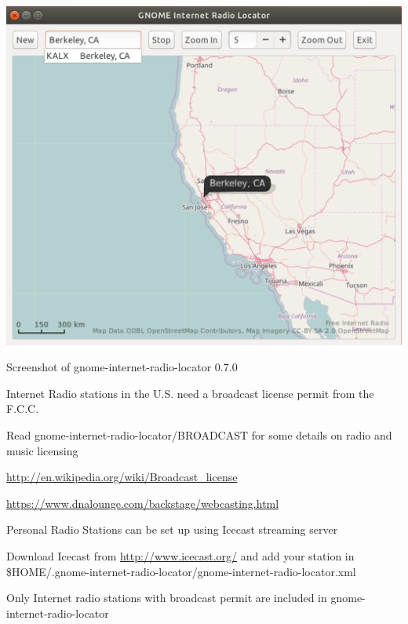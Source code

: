 \documentclass[20pt,landscape]{foils}
\begin{document}

\begin{center}

  \colorbox{white}{\includegraphics[width=0.6\hsize]{../data/screenshot.png}}

  {\blueem Screenshot of gnome-internet-radio-locator 0.7.0}

\end{center}


\begin{list1}
  \item Internet Radio stations in the U.S. need a broadcast license permit from the F.C.C.
    \begin{list2}
    \item Read gnome-internet-radio-locator/BROADCAST for some details on radio and music licensing
    \item \url{http://en.wikipedia.org/wiki/Broadcast_license}
    \item \url{https://www.dnalounge.com/backstage/webcasting.html}
    \end{list2}
  \item Personal Radio Stations can be set up using Icecast streaming server
    \begin{list2}
    \item Download Icecast from \url{http://www.icecast.org/} and add your station in \$HOME/.gnome-internet-radio-locator/gnome-internet-radio-locator.xml
    \end{list2}
  \item Only Internet radio stations with broadcast permit are included in gnome-internet-radio-locator
\end{list1}

\end{document}
